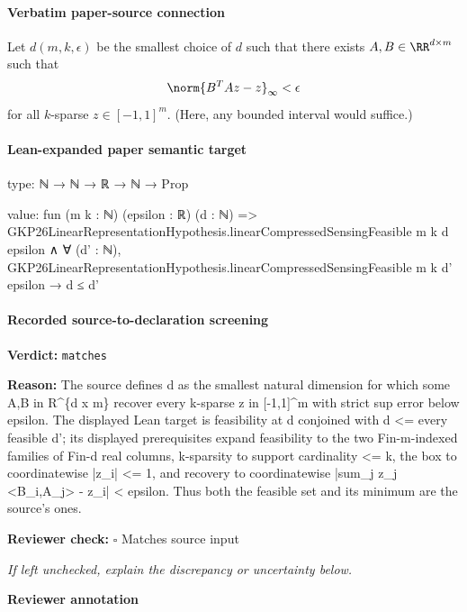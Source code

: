 \documentclass[10pt]{article}
\newcommand{\reviewerbox}{%
  \par\noindent\fbox{\parbox{0.96\linewidth}{\rule{0pt}{0.38in}}}\par
}
\newcommand{\reviewmatch}[1]{%
  \par\noindent\textbf{Reviewer check:} $\square$\; #1\par
  \noindent\emph{If left unchecked, explain the discrepancy or uncertainty below.}\par
}
\begin{document}
\paragraph{Verbatim paper-source connection}
\begin{ReviewVerbatim}
Let $d(m,k,\epsilon)$ be the smallest choice of $d$ such that there exists $A,B\in \RR^{d\times m}$ such that
\begin{equation}
    \norm{B^TAz - z}_\infty < \epsilon
\end{equation}
for all $k$-sparse $z\in [-1,1]^m$. (Here, any bounded interval would suffice.)
\end{ReviewVerbatim}



\paragraph{Lean-expanded paper semantic target}
\begin{ReviewVerbatim}
type:
ℕ → ℕ → ℝ → ℕ → Prop

value:
fun (m k : ℕ) (epsilon : ℝ) (d : ℕ) =>
  GKP26LinearRepresentationHypothesis.linearCompressedSensingFeasible m k d epsilon ∧
    ∀ (d' : ℕ), GKP26LinearRepresentationHypothesis.linearCompressedSensingFeasible m k d' epsilon → d ≤ d'
\end{ReviewVerbatim}

\paragraph{Recorded source-to-declaration screening}
\textbf{Verdict:} \texttt{matches}
\\
{\raggedright
\textbf{Reason:} The source defines d as the smallest natural dimension for which some A,B in R\textasciicircum{}\{d x m\} recover every k-\allowbreak{}sparse z in [-\allowbreak{}1,1]\textasciicircum{}m with strict sup error below epsilon.\allowbreak{} The displayed Lean target is feasibility at d conjoined with d <= every feasible d';\allowbreak{} its displayed prerequisites expand feasibility to the two Fin-\allowbreak{}m-\allowbreak{}indexed families of Fin-\allowbreak{}d real columns, k-\allowbreak{}sparsity to support cardinality <= k, the box to coordinatewise |z\_\allowbreak{}i| <= 1, and recovery to coordinatewise |sum\_\allowbreak{}j z\_\allowbreak{}j <B\_\allowbreak{}i,A\_\allowbreak{}j> -\allowbreak{} z\_\allowbreak{}i| < epsilon.\allowbreak{} Thus both the feasible set and its minimum are the source's ones.\allowbreak{}
\par}
\reviewmatch{Matches source input}
\noindent\textbf{Reviewer annotation}\par
\reviewerbox
\clearpage
\hypertarget{paper-prerequisite-9afe7bd458014ebc}{}
\end{document}
